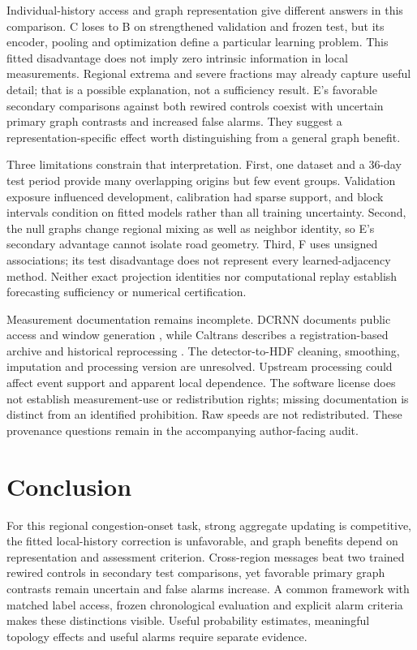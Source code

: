 \documentclass{llncs}
\begin{document}
Individual-history access and graph representation give different answers in this comparison. C loses to B on strengthened validation and frozen test, but its encoder, pooling and optimization define a particular learning problem. This fitted disadvantage does not imply zero intrinsic information in local measurements. Regional extrema and severe fractions may already capture useful detail; that is a possible explanation, not a sufficiency result. E's favorable secondary comparisons against both rewired controls coexist with uncertain primary graph contrasts and increased false alarms. They suggest a representation-specific effect worth distinguishing from a general graph benefit.

Three limitations constrain that interpretation. First, one dataset and a 36-day test period provide many overlapping origins but few event groups. Validation exposure influenced development, calibration had sparse support, and block intervals condition on fitted models rather than all training uncertainty. Second, the null graphs change regional mixing as well as neighbor identity, so E's secondary advantage cannot isolate road geometry. Third, F uses unsigned associations; its test disadvantage does not represent every learned-adjacency method. Neither exact projection identities nor computational replay establish forecasting sufficiency or numerical certification.

Measurement documentation remains incomplete. DCRNN documents public access and window generation \cite{release}, while Caltrans describes a registration-based archive and historical reprocessing \cite{caltrans}. The detector-to-HDF cleaning, smoothing, imputation and processing version are unresolved. Upstream processing could affect event support and apparent local dependence. The software license does not establish measurement-use or redistribution rights; missing documentation is distinct from an identified prohibition. Raw speeds are not redistributed. These provenance questions remain in the accompanying author-facing audit.

\section{Conclusion}
For this regional congestion-onset task, strong aggregate updating is competitive, the fitted local-history correction is unfavorable, and graph benefits depend on representation and assessment criterion. Cross-region messages beat two trained rewired controls in secondary test comparisons, yet favorable primary graph contrasts remain uncertain and false alarms increase. A common framework with matched label access, frozen chronological evaluation and explicit alarm criteria makes these distinctions visible. Useful probability estimates, meaningful topology effects and useful alarms require separate evidence.
\end{document}
